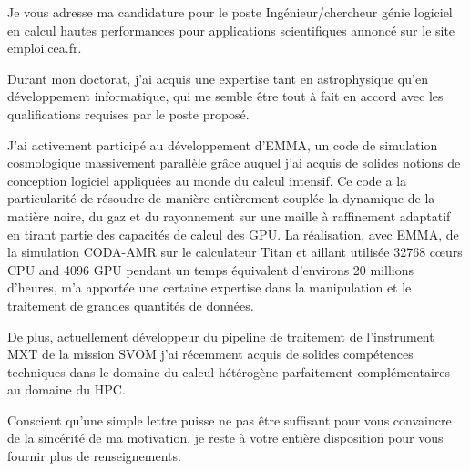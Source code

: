 \documentclass[12pt,stdletter,orderfromtodate,sigleft]{newlfm}
\begin{document}
\begin{newlfm}




Je vous adresse ma candidature pour le poste Ingénieur/chercheur génie logiciel	en calcul hautes performances pour applications scientifiques annoncé sur le site emploi.cea.fr.



Durant mon doctorat, j'ai acquis une expertise tant en astrophysique qu'en développement informatique, qui me semble être tout à fait en accord avec les qualifications requises par le poste proposé.

J'ai activement participé au développement d'EMMA, un code de simulation cosmologique massivement parallèle grâce auquel j'ai acquis de solides notions de conception logiciel appliquées au monde du calcul intensif. 
Ce code a la particularité de résoudre de manière entièrement couplée la dynamique de la matière noire, du gaz et du rayonnement sur une maille à raffinement adaptatif en tirant partie des capacités de calcul des GPU.
La réalisation, avec EMMA,  de la simulation CODA-AMR sur le calculateur Titan et aillant utilisée 32768 cœurs CPU and 4096 GPU pendant un temps équivalent d'environs 20 millions d'heures, m'a apportée une certaine expertise dans la manipulation et le traitement de grandes quantités de données.

De plus, actuellement développeur du pipeline de traitement de l'instrument MXT de la mission SVOM j'ai récemment acquis
de solides compétences techniques dans le domaine du calcul hétérogène parfaitement complémentaires au domaine du HPC.







Conscient qu'une simple lettre puisse ne pas être suffisant pour vous convaincre de la sincérité de ma motivation, 
je reste à votre entière disposition pour vous fournir plus de renseignements.


\end{newlfm}
\end{document}
